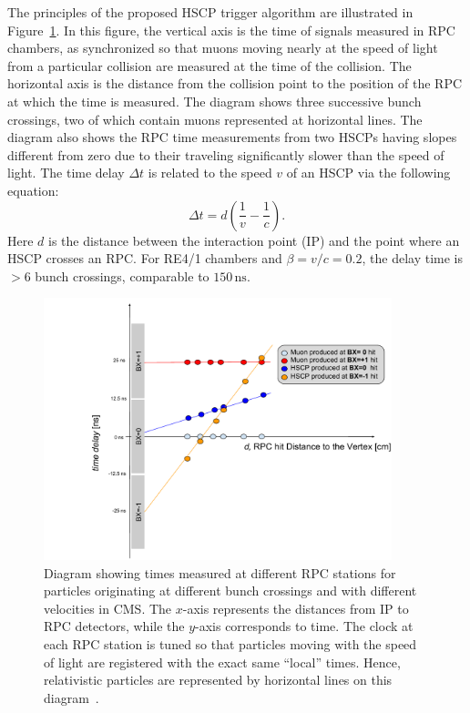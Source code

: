 The principles of the proposed HSCP trigger algorithm are illustrated in Figure~\ref{fig:HSCP_diagram}. In this figure, the vertical axis is the time of signals measured in RPC chambers, as synchronized so that muons moving nearly at the speed of light from a particular collision are measured at the time of the collision. The horizontal axis is the distance from the collision point to the position of the RPC at which the time is measured. The diagram shows three successive bunch crossings, two of which contain muons represented at horizontal lines. The diagram also shows the RPC time measurements from two HSCPs having slopes different from zero due to their traveling significantly slower than the speed of light. The time delay $\Delta t$ is related to the speed $v$ of an HSCP via the following equation:
%
\begin{equation}
\label{eq:HSCP_delay}
\Delta t = d\left(\frac{1}{v}-\frac{1}{c}\right).
\end{equation}
%
Here $d$ is the distance between the interaction point (IP) and the point where an HSCP crosses an RPC. For RE4/1 chambers and $\beta = v/c = 0.2$, the delay time is $>6$ bunch crossings, comparable to $150 \, \mathrm{ns}$.

\begin{figure}[t]
  \centering
  \includegraphics[width=0.9\textwidth]{figures/HSCP/diagram.pdf}
  \caption{Diagram showing times measured at different RPC stations for particles originating at different bunch crossings and with different velocities in CMS. The $x$-axis represents the distances from IP to RPC detectors, while the $y$-axis corresponds to time. The clock at each RPC station is tuned so that particles moving with the speed of light are registered with the exact same ``local'' times. Hence, relativistic particles are represented by horizontal lines on this diagram~\cite{Lourenco:2283189}.}
  \label{fig:HSCP_diagram}
\end{figure}

